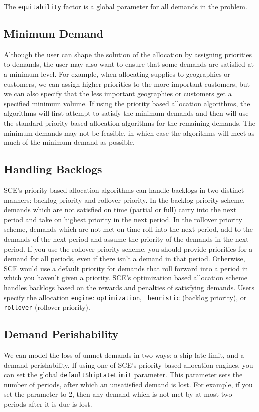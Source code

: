 The {\tt equitability} factor is a global parameter for all demands in
the problem.

\subsection{Minimum Demand}
Although the user can shape the solution of the allocation by
assigning priorities to demands, the user may also want to ensure that
some demands are satisfied at a minimum level.  For example, when
allocating supplies to geographies or customers, we can assign higher
priorities to the more important customers, but we can also specify
that the less important geographies or customers get a specified
minimum volume.  If using the priority based allocation algorithms,
the algorithms will first attempt to satisfy the minimum demands and
then will use the standard priority based allocation algorithms for
the remaining demands.  The minimum demands may not be feasible, in
which case the algorithms will meet as much
of the minimum demand as possible.  

\subsection{Handling Backlogs}
SCE's priority based allocation algorithms can handle backlogs in two
distinct manners: backlog priority and rollover priority.  In the
backlog priority scheme, demands which are not satisfied on time
(partial or full) carry into the next period and take on highest
priority in the next period.  In the rollover priority scheme, demands
which are not met on time roll into the next period, add to the
demands of the next period and assume the priority of the demands in
the next period.  If you use the rollover priority scheme, you should
provide priorities for a demand for all periods, even if there isn't a
demand in that period.  Otherwise, SCE would use a default priority
for demands that roll forward into a period in which you haven't given
a priority.  SCE's optimization based allocation scheme handles
backlogs based on the rewards and penalties of satisfying demands.
Users specify the allocation {\tt engine}: {\tt optimization}, {\tt
heuristic} (backlog priority), or {\tt rollover} (rollover priority).

\subsection{Demand Perishability}
We can model the loss of unmet demands in two ways: a ship late limit,
and a demand perishability.  If using one of SCE's priority based
allocation engines, you can set the global {\tt defaultShipLateLimit}
parameter.  This parameter sets the number of periods, after which an
unsatisfied demand is lost.  For example, if you set the parameter to
2, then any demand which is not met by at most two periods after it is
due is lost.

